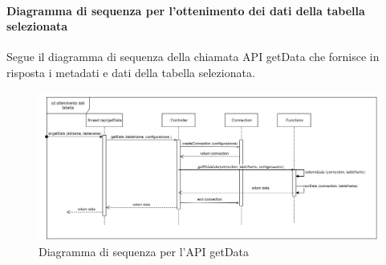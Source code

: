    \paragraph{Diagramma di sequenza per l'ottenimento dei dati della tabella selezionata}
    Segue il diagramma di sequenza della chiamata API getData che fornisce in risposta i metadati e dati della tabella selezionata.
            \begin{figure}[H]
                \centering\includegraphics[width=1\textwidth]{source/img/API_getData.png}
                \caption{Diagramma di sequenza per l'API getData}
            \end{figure}